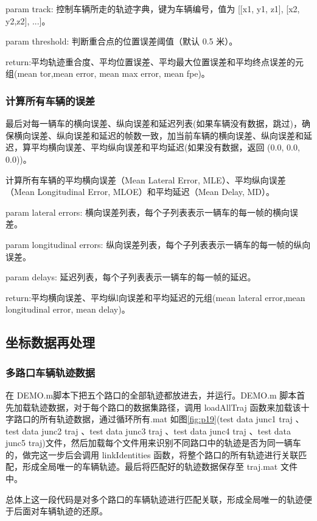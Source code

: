 param track: 控制车辆所走的轨迹字典，键为车辆编号，值为 [[x1, y1, z1], [x2, y2,z2], ...]。

param threshold: 判断重合点的位置误差阈值（默认 0.5 米）。

return:平均轨迹重合度、平均位置误差、平均最大位置误差和平均终点误差的元组(mean tor,mean error, mean max error, mean fpe)。


\subsubsection{计算所有车辆的误差}
最后对每一辆车的横向误差、纵向误差和延迟列表(如果车辆没有数据，跳过)，确保横向误差、纵向误差和延迟的帧数一致，加当前车辆的横向误差、纵向误差和延迟，算平均横向误差、平均纵向误差和平均延迟(如果没有数据，返回 (0.0, 0.0, 0.0))。

计算所有车辆的平均横向误差（Mean Lateral Error, MLE）、平均纵向误差（Mean Longitudinal Error, MLOE）和平均延迟（Mean Delay, MD）。

param lateral errors: 横向误差列表，每个子列表表示一辆车的每一帧的横向误差。

param longitudinal errors: 纵向误差列表，每个子列表表示一辆车的每一帧的纵向误差。

param delays: 延迟列表，每个子列表表示一辆车的每一帧的延迟。

return:平均横向误差、平均纵l向误差和平均延迟的元组(mean lateral error,mean longitudinal error, mean delay)。


\subsection{坐标数据再处理}
\subsubsection{多路口车辆轨迹数据}



在 DEMO.m脚本下把五个路口的全部轨迹都放进去，并运行。DEMO.m 脚本首先加载轨迹数据，对于每个路口的数据集路径，调用 loadAllTraj 函数来加载该十字路口的所有轨迹数据，通过循环所有.mat 如图\ref{fig:p19}(test data junc1 traj 、test data junc2  traj 、test data junc3 traj 、test   data junc4 traj 、test data junc5 traj)文件，然后加载每个文件用来识别不同路口中的轨迹是否为同一辆车的，做完这一步后会调用 linkIdentities 函数，将整个路口的所有轨迹进行关联匹配，形成全局唯一的车辆轨迹。最后将匹配好的轨迹数据保存至 traj.mat 文件中。

总体上这一段代码是对多个路口的车辆轨迹进行匹配关联，形成全局唯一的轨迹便于后面对车辆轨迹的还原。


